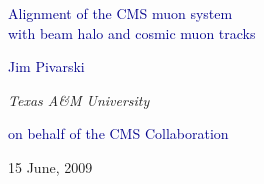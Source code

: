 \documentclass[compress]{beamer}
\begin{document}
\begin{frame}
\vfill
\begin{center}
\textcolor{darkblue}{\Large Alignment of the CMS muon system \\ \vspace{0.15 cm}with beam halo and cosmic muon tracks}

\vfill
\begin{center}
\large
\textcolor{darkblue}{Jim Pivarski}

\scriptsize
\vspace{0.25 cm}
{\it Texas A\&M University}

\vspace{0.75 cm}
\small
\textcolor{darkblue}{on behalf of the CMS Collaboration}
\end{center}

\vfill
15 June, 2009

\end{center}
\end{frame}


\small
\end{document}

